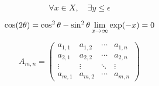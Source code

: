 \documentclass{article}
\begin{document}
\begin{equation} %
	\forall x \in X, \quad \exists y \leq \epsilon
\end{equation}

\begin{equation} %
	\cos (2\theta) = \cos^2 \theta - \sin^2 \theta \\
	\lim_{x \to \infty} \exp(-x) = 0
\end{equation}

\begin{equation} %
A_{m,n} = 
 \begin{pmatrix}
  a_{1,1} & a_{1,2} & \cdots & a_{1,n} \\
  a_{2,1} & a_{2,2} & \cdots & a_{2,n} \\
  \vdots  & \vdots  & \ddots & \vdots  \\
  a_{m,1} & a_{m,2} & \cdots & a_{m,n} 
 \end{pmatrix}
\end{equation}
\end{document}
